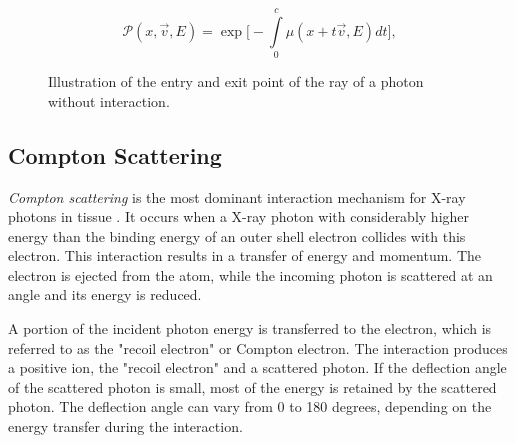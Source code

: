 $$\mathcal{P}(x, \vec{v}, E) = \exp \bigg[ -\int\limits_{0}^{c}{\mu(x+t\vec{v}, E)} dt \bigg],$$

\begin{figure}[H]
    \centering
    \caption{Illustration of the entry and exit point of the ray of a photon without interaction.}
    \label{fig:exit_point}
\end{figure}



\subsection{Compton Scattering}
\emph{Compton scattering} is the most dominant interaction mechanism for X-ray
photons in tissue \cite[Chap. 7]{medicalImagingSystemsIntro2019:}. It occurs
when a X-ray photon with considerably higher energy than the binding energy of an outer shell electron collides with this electron. This interaction
results in a transfer of energy and momentum. The electron is ejected from the atom, while the incoming photon is scattered at an
angle and its energy is reduced.

A portion of the incident photon energy is transferred to the electron, which
is referred to as the "recoil electron" or Compton electron. The interaction
produces a positive ion, the "recoil electron" and a scattered photon. If the deflection angle of the scattered photon is small, most of the energy is retained by the scattered photon. The deflection angle can vary from 0 to 180 degrees, depending on the energy transfer during the interaction.

